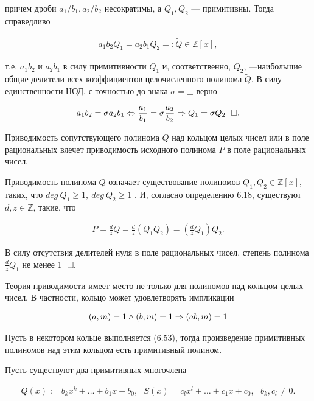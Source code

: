 \documentclass{article}
\begin{document}
причем дроби $a_1/b_1, a_2/b_2$ несократимы, а $Q_1, Q_2$ --- примитивны.
Тогда справедливо

\begin{align*}
	a_1 b_2 Q_1 = a_2 b_1 Q_2 =:\tilde{Q}\in\mathbb{Z} [x],
\end{align*}

т.е. $a_1 b_2$ и $a_2 b_1$ в силу примитивности $Q_1$ и, соответственно, $Q_2$,
---наибольшие общие делители всех коэффициентов целочисленного полинома
$\tilde{Q}$. В силу единственности НОД, с точностью до знака $\sigma =\pm$ верно

\begin{align*}
	a_1 b_2 =\sigma a_2 b_1 \Lrarr \frac{a_1}{b_1} = \sigma\frac{a_2}{b_2} \Rarr Q_1 = \sigma Q_2~\qed
\end{align*} \newpage

\theorem[6.30]

Приводимость сопутствующего полинома $Q$ над кольцом целых чисел
или в поле рациональных влечет приводимость исходного полинома $P$ в поле рациональных чисел.

\proof

Приводимость полинома $Q$ означает существование полиномов
$Q_1, Q_2\in\mathbb{Z} [x]$, таких, что $deg~Q_1\geq 1,~deg~Q_2\geq 1$ . И, согласно определению 6.18, существуют $d, z\in\mathbb{Z}$, такие, что

\begin{align*}
	P=\frac{d}{z} Q=\frac{d}{z} (Q_1 Q_2)=(\frac{d}{z} Q_1) Q_2.
\end{align*}

В силу отсутствия делителей нуля в поле рациональных чисел, степень полинома
$\frac{d}{z} Q_1$ не менее 1 $\qed$ \newline

Теория приводимости имеет место не только для полиномов над кольцом целых чисел.
В частности, кольцо может удовлетворять импликации

\begin{align}
	(a, m)=1\land (b, m)=1 \Rarr (ab, m)=1\label{40:gt}
\end{align}


Пусть в некотором кольце выполняется (6.53), тогда
произведение примитивных полиномов над этим кольцом есть примитивный полином.

\proof

Пусть существуют два примитивных многочлена

\begin{align*}
	Q(x):=b_k x^k+\ldots +b_1 x+b_0,~~~
	S(x)=c_l x^l+\ldots +c_1 x+c_0,~~~
	b_k, c_l\neq 0.
\end{align*}
\end{document}
